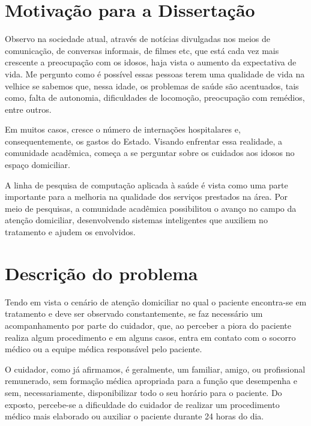 
\section{Motivação para a Dissertação}\label{sec:motivacao}

Observo na sociedade atual, através de notícias divulgadas nos meios
de comunicação, de conversas informais, de filmes etc, que está cada
vez mais crescente a preocupação com os idosos, haja vista o
aumento da expectativa de vida. Me pergunto como é possível essas pessoas
terem uma qualidade de vida na velhice se sabemos que, nessa idade,
os problemas de saúde são acentuados, tais como, falta de autonomia,
dificuldades de locomoção, preocupação com remédios, entre outros.

Em muitos casos, cresce o número de internações hospitalares e,
consequentemente, os gastos do Estado. Visando enfrentar essa 
realidade, a comunidade acadêmica, %
começa a se perguntar sobre os cuidados aos idosos no espaço domiciliar.

A linha de pesquisa de computação aplicada à saúde é vista como uma parte
importante para a melhoria na qualidade dos serviços prestados na área. Por meio
de pesquisas, a comunidade acadêmica possibilitou o avanço no campo da atenção
domiciliar, desenvolvendo sistemas inteligentes que auxiliem no tratamento e
ajudem os envolvidos.

\section{Descrição do problema}\label{sec:descricao-problema}

Tendo em vista o cenário de atenção domiciliar no qual o paciente
encontra-se em tratamento e deve ser observado constantemente, 
se faz necessário um acompanhamento por parte do cuidador, que, ao perceber 
a piora do paciente realiza algum procedimento e em alguns casos, entra 
em contato com o socorro médico ou a equipe médica responsável pelo paciente.

O cuidador, como já afirmamos, é geralmente, um familiar, amigo, ou profissional
remunerado, sem formação médica apropriada para a função que desempenha  e sem,
necessariamente, disponibilizar todo o seu horário para o paciente. Do exposto,
percebe-se a dificuldade do cuidador de realizar um procedimento médico mais
elaborado ou auxiliar o paciente durante 24 horas do dia.

